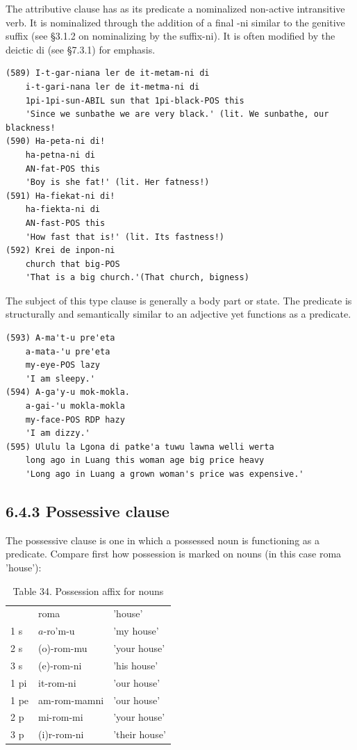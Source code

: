 \documentclass[10pt]{article}
\begin{document}
The attributive clause has as its predicate a nominalized non-active intransitive verb. It is nominalized through the addition of a final -ni similar to the genitive suffix (see §3.1.2 on nominalizing by the suffix-ni). It is often modified by the deictic di (see §7.3.1) for emphasis.

\begin{verbatim}
(589) I-t-gar-niana ler de it-metam-ni di
    i-t-gari-nana ler de it-metma-ni di
    1pi-1pi-sun-ABIL sun that 1pi-black-POS this
    'Since we sunbathe we are very black.' (lit. We sunbathe, our blackness!
(590) Ha-peta-ni di!
    ha-petna-ni di
    AN-fat-POS this
    'Boy is she fat!' (lit. Her fatness!)
(591) Ha-fiekat-ni di!
    ha-fiekta-ni di
    AN-fast-POS this
    'How fast that is!' (lit. Its fastness!)
(592) Krei de inpon-ni
    church that big-POS
    'That is a big church.'(That church, bigness)
\end{verbatim}

The subject of this type clause is generally a body part or state. The predicate is structurally and semantically similar to an adjective yet functions as a predicate.

\begin{verbatim}
(593) A-ma't-u pre'eta
    a-mata-'u pre'eta
    my-eye-POS lazy
    'I am sleepy.'
(594) A-ga'y-u mok-mokla.
    a-gai-'u mokla-mokla
    my-face-POS RDP hazy
    'I am dizzy.'
(595) Ululu la Lgona di patke'a tuwu lawna welli werta
    long ago in Luang this woman age big price heavy
    'Long ago in Luang a grown woman's price was expensive.'
\end{verbatim}

\subsection*{6.4.3 Possessive clause}
The possessive clause is one in which a possessed noun is functioning as a predicate. Compare first how possession is marked on nouns (in this case roma 'house'):

\begin{table}[h]
\begin{center}
\captionsetup{labelformat=empty}
\caption{Table 34. Possession affix for nouns}
\begin{tabular}{|lll|}
\hline
 & roma & 'house' \\
1 s & \(a\)-ro'm-u & 'my house' \\
2 s & (o)-rom-mu & 'your house' \\
3 s & (e)-rom-ni & 'his house' \\
1 pi & it-rom-ni & 'our house' \\
1 pe & am-rom-mamni & 'our house' \\
2 p & mi-rom-mi & 'your house' \\
3 p & (i)r-rom-ni & 'their house' \\
\hline
\end{tabular}
\end{center}
\end{table}
\end{document}
